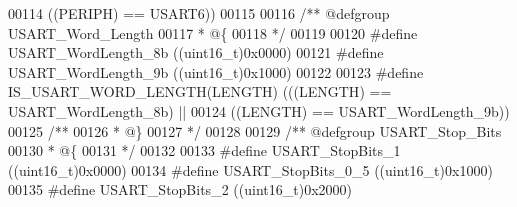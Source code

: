 \begin{DoxyCode}
00114                                       \textcolor{preprocessor}{(}\textcolor{preprocessor}{(}\textcolor{preprocessor}{PERIPH}\textcolor{preprocessor}{)} \textcolor{preprocessor}{==} USART6\textcolor{preprocessor}{)}\textcolor{preprocessor}{)}
00115 
00116 \textcolor{comment}{/** @defgroup USART\_Word\_Length }
00117 \textcolor{comment}{  * @\{}
00118 \textcolor{comment}{  */}
00119 
00120 \textcolor{preprocessor}{#}\textcolor{preprocessor}{define} \textcolor{preprocessor}{USART\_WordLength\_8b}                  \textcolor{preprocessor}{(}\textcolor{preprocessor}{(}\textcolor{preprocessor}{uint16\_t}\textcolor{preprocessor}{)}0x0000\textcolor{preprocessor}{)}
00121 \textcolor{preprocessor}{#}\textcolor{preprocessor}{define} \textcolor{preprocessor}{USART\_WordLength\_9b}                  \textcolor{preprocessor}{(}\textcolor{preprocessor}{(}\textcolor{preprocessor}{uint16\_t}\textcolor{preprocessor}{)}0x1000\textcolor{preprocessor}{)}
00122 
00123 \textcolor{preprocessor}{#}\textcolor{preprocessor}{define} \textcolor{preprocessor}{IS\_USART\_WORD\_LENGTH}\textcolor{preprocessor}{(}\textcolor{preprocessor}{LENGTH}\textcolor{preprocessor}{)} \textcolor{preprocessor}{(}\textcolor{preprocessor}{(}\textcolor{preprocessor}{(}\textcolor{preprocessor}{LENGTH}\textcolor{preprocessor}{)} \textcolor{preprocessor}{==} USART_WordLength_8b\textcolor{preprocessor}{)} \textcolor{preprocessor}{||}
00124                                       \textcolor{preprocessor}{(}\textcolor{preprocessor}{(}\textcolor{preprocessor}{LENGTH}\textcolor{preprocessor}{)} \textcolor{preprocessor}{==} USART_WordLength_9b\textcolor{preprocessor}{)}\textcolor{preprocessor}{)}
00125 \textcolor{comment}{/**}
00126 \textcolor{comment}{  * @\}}
00127 \textcolor{comment}{  */}
00128 
00129 \textcolor{comment}{/** @defgroup USART\_Stop\_Bits }
00130 \textcolor{comment}{  * @\{}
00131 \textcolor{comment}{  */}
00132 
00133 \textcolor{preprocessor}{#}\textcolor{preprocessor}{define} \textcolor{preprocessor}{USART\_StopBits\_1}                     \textcolor{preprocessor}{(}\textcolor{preprocessor}{(}\textcolor{preprocessor}{uint16\_t}\textcolor{preprocessor}{)}0x0000\textcolor{preprocessor}{)}
00134 \textcolor{preprocessor}{#}\textcolor{preprocessor}{define} \textcolor{preprocessor}{USART\_StopBits\_0\_5}                   \textcolor{preprocessor}{(}\textcolor{preprocessor}{(}\textcolor{preprocessor}{uint16\_t}\textcolor{preprocessor}{)}0x1000\textcolor{preprocessor}{)}
00135 \textcolor{preprocessor}{#}\textcolor{preprocessor}{define} \textcolor{preprocessor}{USART\_StopBits\_2}                     \textcolor{preprocessor}{(}\textcolor{preprocessor}{(}\textcolor{preprocessor}{uint16\_t}\textcolor{preprocessor}{)}0x2000\textcolor{preprocessor}{)}

\end{DoxyCode}
